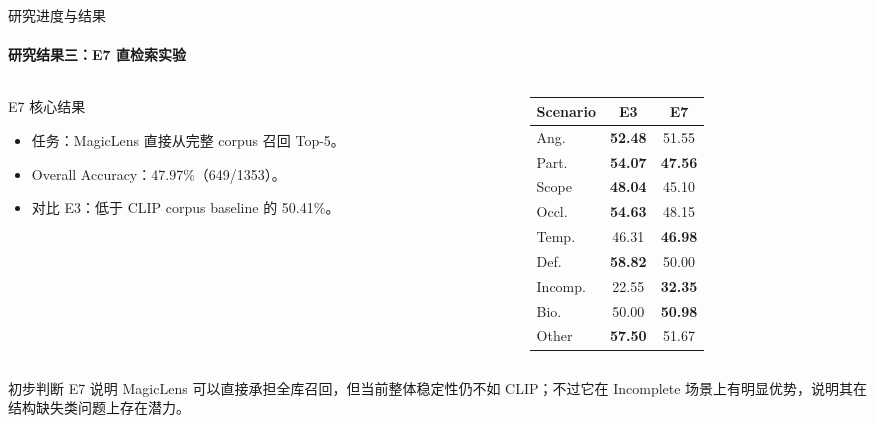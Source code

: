 \documentclass[10pt,aspectratio=169,]{beamer}
\newcommand{\best}[1]{\textcolor{green!45!black}{\textbf{#1}}}
\newcommand{\worst}[1]{\textcolor{red!75!black}{\textbf{#1}}}
\begin{document}
\begin{frame}{研究进度与结果}
	\framesubtitle{研究结果三：E7 直检索实验}
	\begin{columns}[T]
		\begin{column}{0.44\textwidth}
			\begin{block}{E7 核心结果}
				\begin{itemize}
					\item 任务：MagicLens 直接从完整 corpus 召回 Top-5。
					\item Overall Accuracy：47.97\%（649/1353）。
					\item 对比 E3：低于 CLIP corpus baseline 的 50.41\%。
				\end{itemize}
			\end{block}
		\end{column}
			\begin{column}{0.52\textwidth}
				\centering
				\scriptsize
				\setlength{\tabcolsep}{6pt}
				\renewcommand{\arraystretch}{1.05}
				\begin{tabular}{lcc}
					\toprule
					Scenario & E3 & E7 \\
					\midrule
					Ang. & \best{52.48} & 51.55 \\
					Part. & \best{54.07} & \worst{47.56} \\
					Scope & \best{48.04} & 45.10 \\
					Occl. & \best{54.63} & 48.15 \\
					Temp. & 46.31 & \best{46.98} \\
					Def. & \best{58.82} & 50.00 \\
					Incomp. & 22.55 & \best{32.35} \\
					Bio. & 50.00 & \best{50.98} \\
					Other & \best{57.50} & 51.67 \\
					\bottomrule
				\end{tabular}
			\end{column}
	\end{columns}
	\vspace{0.4em}
	\begin{alertblock}{初步判断}
		E7 说明 MagicLens 可以直接承担全库召回，但当前整体稳定性仍不如 CLIP；不过它在 Incomplete 场景上有明显优势，说明其在结构缺失类问题上存在潜力。
	\end{alertblock}
\end{frame}
\end{document}
